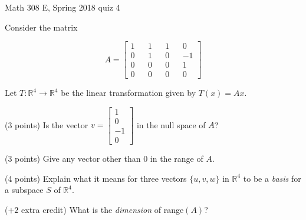 \documentclass{exam}
\begin{document}
 
\begin{center} \begin{Large} Math 308 E, Spring 2018 quiz 4 \end{Large}
\end{center} 

\vspace{5mm}

\begin{center}
\end{center}

\vspace{1cm}
 

\vspace{1cm}

Consider the matrix 

\[
A = \begin{bmatrix} 1 && 1 && 1 && 0 \\ 0 && 1 && 0 && -1 \\ 0 && 0 && 0 && 1  \\ 0 && 0 && 0 && 0 \end{bmatrix}
\]

Let $T: \mathbb{R}^4 \to \mathbb{R}^4$ be the linear transformation given by $T(x) = Ax$. 

\begin{questions}
\question (3 points) Is the vector $v = \begin{bmatrix} 1 \\ 0 \\ -1 \\ 0 \end{bmatrix}$ in the null space of $A$? 

\vfill

\question (3 points) Give any vector other than $0$ in the range of $A$.

\vfill 

\question(4 points) Explain what it means for three vectors $\{u,v,w\}$ in $\mathbb{R}^4$ to be a \emph{basis} for a subspace $S$ of $\mathbb{R}^4$.

\vfill

\question($+2$ extra credit) What is the \emph{dimension} of range$(A)$?

\vfill

\end{questions}
\end{document}
